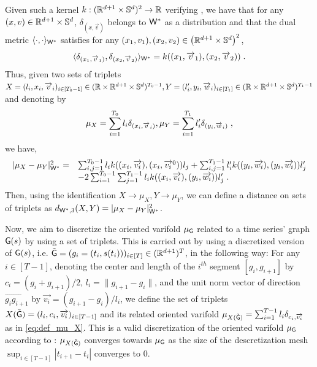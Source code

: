 Given such a kernel $k:(\mathbb{R}^{d+1} \times \mathbb{S}^d)^2\to \mathbb{R}$
verifying \citep[Proposition 2 \& 4]{kaltenmark2017general}, we have that for any $(x,v)\in \mathbb{R}^{d+1}\times \mathbb{S}^{d}$, $\delta_{(x,\overrightarrow{v})}$ belongs to $\mathsf{W}^*$ as a distribution and that the dual metric $\langle\cdot,\cdot \rangle_{\mathsf{W}^*} $ satisfies for any $(x_1,v_1),(x_2,v_2)\in \left(\mathbb{R}^{d+1}\times \mathbb{S}^{d}\right)^2$,
\begin{equation}
  \langle\delta_{(x_1,\overrightarrow{v}_1)},\delta_{(x_2,\overrightarrow{v}_2)} \rangle_{\mathsf{W}^*} =k((x_1,\overrightarrow{v}_1),(x_2,\overrightarrow{v}_2)) \; .
\end{equation}
Thus, given two sets of triplets $X=(l_i,x_i,\overrightarrow{v}_i)_{i\in[T_0-1]}\in (\mathbb{R}\times \mathbb{R}^{d+1}\times \mathbb{S}^d)^{T_0-1},Y=(l_i',y_i,\overrightarrow{w}_i)_{i\in[T_1]}\in (\mathbb{R}\times \mathbb{R}^{d+1}\times \mathbb{S}^d)^{T_1-1}$ and denoting by 
\begin{equation}
  \label{eq:def_mu_X}
  \mu_X=\sum_{i=1}^{T_0} l_i \delta_{(x_i,\overrightarrow{v}_i)},\mu_Y=\sum_{i=1}^{T_1} l_i' \delta_{(y_i,\overrightarrow{w}_i)} \;,
\end{equation}
 we have,
\begin{equation}
  \begin{array}{ll}
    |\mu_X-\mu_Y |_{\mathsf{W}^*}^2 = & \sum_{i,j = 1}^{T_0-1}l_i k((x_i,\overrightarrow{v_i}),(x_i,\overrightarrow{v_i}^0))l_j + \sum_{i,j = 1}^{T_1-1}l_i' k((y_i,\overrightarrow{w_i}),(y_i,\overrightarrow{w_i}))l_j' \\
    & - 2 \sum_{i=1}^{T_0-1}\sum_{j=1}^{T_1-1}l_i k((x_i,\overrightarrow{v_i}),(y_i,\overrightarrow{w_i}))l_j' \;.
  \end{array}
\end{equation}
Then, using the identification $X\to \mu_X, Y\to \mu_Y$, we can define a distance on sets of triplets as $d_{\mathsf{W}^*,3}(X,Y)=|\mu_X-\mu_Y|_{\mathsf{W}^*}^2$.

Now, we aim to discretize the oriented varifold $\mu_{\mathsf{G}} $ related to a time series' graph $\mathsf{G}(s)$ by using a set of triplets.
This is carried out by using a discretized version of $\mathsf{G}(s) $, i.e. $\tilde{\mathsf{G}}=(g_i=(t_i,s(t_i)))_{i\in[T]}\in(\mathbb{R}^{d+1})^T$, in the following way: 
For any  $i\in[T-1]$, denoting the center and length of the $i^{th}$ segment $[g_i,g_{i+1}]$ by
$c_i = (g_i + g_{i+1})/2$, $l_i = \| g_{i+1}-g_{i}\|$, and the unit norm vector of direction $\overrightarrow{g_i g_{i+1}}$ by
 $\overrightarrow{v_i} = (g_{i+1}-g_{i})/l_i$, we define the set of triplets $X(\tilde{\mathsf{G}})=(l_i,c_i,\overrightarrow{v_i})_{i\in[T-1]}$ and its related oriented varifold $\mu_{X(\tilde{\mathsf{G}})}= \sum_{i=1}^{T-1}l_i \delta_{c_i,\overrightarrow{v_i}}$ as in \eqref{eq:def_mu_X}.
 This is a valid discretization of the oriented varifold $\mu_{\mathsf{G}}$ according to \citep[Proposition 1]{kaltenmark2017general}: $\mu_{X(\tilde{\mathsf{G}})}$ converges towards $\mu_{\mathsf{G}}$ as the size of the descretization mesh $\sup_{i\in[T-1]} |t_{i+1}-t_i| $ converges to 0.

